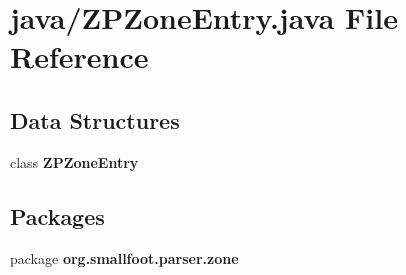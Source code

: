 \section{java/\+Z\+P\+Zone\+Entry.java File Reference}
\label{ZPZoneEntry_8java}
\subsection*{Data Structures}
\begin{DoxyCompactItemize}
\item 
class {\bfseries Z\+P\+Zone\+Entry}
\end{DoxyCompactItemize}
\subsection*{Packages}
\begin{DoxyCompactItemize}
\item 
package {\bf org.\+smallfoot.\+parser.\+zone}
\end{DoxyCompactItemize}
